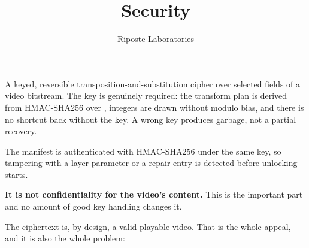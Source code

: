 \documentclass[fontpath=fonts/,logopath=logo/]{riposte-doc}
\title{Security}
\author{Riposte Laboratories}
\date{}
\begin{document}
\ripmakehead

\riptoc



A keyed, reversible transposition-and-substitution cipher over selected fields of a video bitstream. The key is genuinely required: the transform plan is derived from HMAC-SHA256 over , integers are drawn without modulo bias, and there is no shortcut back without the key. A wrong key produces garbage, not a partial recovery.

The manifest is authenticated with HMAC-SHA256 under the same key, so tampering with a layer parameter or a repair entry is detected before unlocking starts.



\textbf{It is not confidentiality for the video's content.} This is the important part and no amount of good key handling changes it.

The ciphertext is, by design, a valid playable video. That is the whole appeal, and it is also the whole problem:
\end{document}

